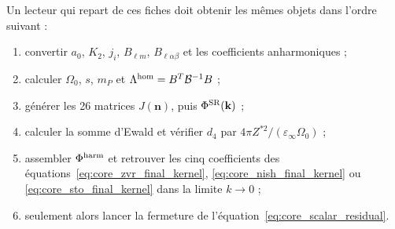 Un lecteur qui repart de ces fiches doit obtenir les mêmes objets dans l'ordre
suivant :
\begin{enumerate}[label=\textbf{R\arabic*.},leftmargin=3.2em,itemsep=2pt]
  \item convertir $a_0$, $K_2$, $j_i$, $B_{\ell m}$,
  $B_{\ell\alpha\beta}$ et les coefficients anharmoniques ;
  \item calculer $\Omega_0$, $s$, $m_P$ et
  $\Lambda^{\rm hom}=B^T\mathcal B^{-1}B$ ;
  \item générer les 26 matrices $J(\mathbf n)$, puis
  $\Phi^{\rm SR}(\mathbf k)$ ;
  \item calculer la somme d'Ewald et vérifier $d_4$ par
  $4\pi Z^{*2}/(\varepsilon_\infty\Omega_0)$ ;
  \item assembler $\Phi^{\rm harm}$ et retrouver les cinq coefficients des
  équations~\eqref{eq:core_zvr_final_kernel},
  \eqref{eq:core_nish_final_kernel} ou
  \eqref{eq:core_sto_final_kernel} dans la limite $k\to0$ ;
  \item seulement alors lancer la fermeture de
  l'équation~\eqref{eq:core_scalar_residual}.
\end{enumerate}
